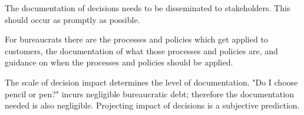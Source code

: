 The documentation of decisions needs to be disseminated to stakeholders. This should occur as promptly as possible. 


For bureaucrats there are the processes and policies which get applied to customers, the documentation of what those processes and policies are, and guidance on when the processes and policies should be applied. 

The scale of decision impact determines the level of documentation. "Do I choose pencil or pen?" incurs negligible bureaucratic debt; therefore the documentation needed is also negligible. Projecting impact of decisions is a subjective prediction. 



